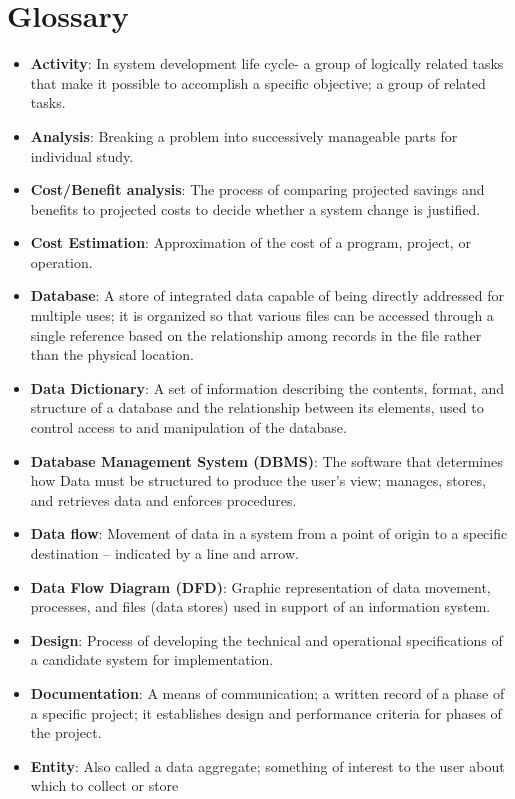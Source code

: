 \section{Glossary}
\begin{itemize}
	\item \textbf{Activity}:  In system development life cycle- a group of logically related tasks that make it possible to
	accomplish a specific objective; a group of related tasks.
	\item \textbf{Analysis}:  Breaking a problem into successively manageable parts for individual study.
	\item \textbf{Cost/Benefit analysis}:  The process of comparing projected savings and benefits to projected costs
	to decide whether a system change is justified.
	\item \textbf{Cost Estimation}:  Approximation of the cost of a program, project, or operation.
	\item \textbf{Database}:  A store of integrated data capable of being directly addressed for multiple uses; it is
	organized so that various files can be accessed through a single reference based on the relationship
	among records in the file rather than the physical location.
	\item \textbf{Data Dictionary}:  A set of information describing the contents, format, and structure of a database
	and the relationship between its elements, used to control access to and manipulation of the
	database.
	\item \textbf{Database Management System (DBMS)}:  The software that determines how Data must be
	structured to produce the user’s view; manages, stores, and retrieves data and enforces procedures.
	\item \textbf{Data flow}:  Movement of data in a system from a point of origin to a specific destination – indicated
	by a line and arrow.
	\item \textbf{Data Flow Diagram (DFD)}:  Graphic representation of data movement, processes, and files (data
	stores) used in support of an information system.
	\item \textbf{Design}:  Process of developing the technical and operational specifications of a candidate system for
	implementation.
	\item \textbf{Documentation}:  A means of communication; a written record of a phase of a specific project; it
	establishes design and performance criteria for phases of the project.
	\item \textbf{Entity}:  Also called a data aggregate; something of interest to the user about which to collect or store

\end{itemize}

